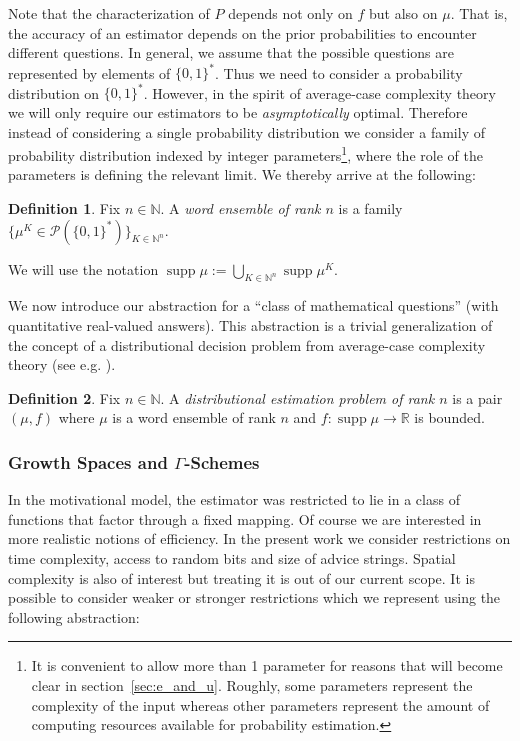 \documentclass{article}
\numberwithin{equation}{section}
\theoremstyle{definition}
\newtheorem{definition}{Definition}[section]
\theoremstyle{plain}
\newcommand{\Bool}{\{0,1\}}
\newcommand{\Words}{{\Bool^*}}
\DeclareMathOperator{\Supp}{supp}
\newcommand{\Nats}{\mathbb{N}}
\newcommand{\Reals}{\mathbb{R}}
\begin{document}
Note that the characterization of $P$ depends not only on $f$ but also on $\mu$. That is, the accuracy of an estimator depends on the prior probabilities to encounter different questions. In general, we assume that the possible questions are represented by elements of $\Words$. Thus we need to consider a probability distribution on $\Words$. However, in the spirit of average-case complexity theory we will only require our estimators to be \emph{asymptotically} optimal. Therefore instead of considering a single probability distribution we consider a family of probability distribution indexed by integer parameters\footnote{It is convenient to allow more than 1 parameter for reasons that will become clear in section~\ref{sec:e_and_u}. Roughly, some parameters represent the complexity of the input whereas other parameters represent the amount of computing resources available for probability estimation.}, where the role of the parameters is defining the relevant limit. We thereby arrive at the following:

\begin{definition}

Fix ${n \in \Nats}$. A \emph{word ensemble of rank ${n}$} is a family ${\{\mu^{K} \in \mathcal{P}(\Words)\}_{K \in \Nats^n}}$.

We will use the notation $\Supp \mu := \bigcup_{K \in \Nats^n} \Supp \mu^K$.

\end{definition}

We now introduce our abstraction for a \enquote{class of mathematical questions} (with quantitative real-valued answers). This abstraction is a trivial generalization of the concept of a distributional decision problem from average-case complexity theory (see e.g. \cite{Bogdanov_2006}).

\begin{definition}

Fix ${n \in \Nats}$. A \emph{distributional estimation problem of rank ${n}$} is a pair $(\mu,f)$ where $\mu$ is a word ensemble of rank ${n}$ and $f: \Supp \mu \rightarrow \Reals$ is bounded.

\end{definition}

\subsubsection{Growth Spaces and \texorpdfstring{$\Gamma$}{Γ}-Schemes}

In the motivational model, the estimator was restricted to lie in a class of functions that factor through a fixed mapping. Of course we are interested in more realistic notions of efficiency. In the present work we consider restrictions on time complexity, access to random bits and size of advice strings. Spatial complexity is also of interest but treating it is out of our current scope. It is possible to consider weaker or stronger restrictions which we represent using the following abstraction:
\end{document}
